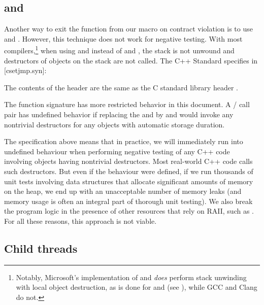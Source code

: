 \subsection{ and }

Another way to exit the function from our  macro on contract violation is to use  and . However, this technique does not work for negative testing. With most compilers,\footnote{Notably, Microsoft's implementation of  and  \emph{does} perform stack unwinding with local object destruction, as is done for  and  (see \cite{MSVCDocLongjmp}), while GCC and Clang do not.} when using  and  instead of  and , the stack is not unwound and destructors of objects on the stack are not called. The C++ Standard specifies in [csetjmp.syn]:

\begin{adjustwidth}{0.5cm}{0.5cm}
The contents of the header  are the same as the C standard library header .

The function signature  has more restricted behavior in this document. A / call pair has undefined behavior if replacing the  and  by  and  would invoke any nontrivial destructors for any objects with automatic storage duration.
\end{adjustwidth}

The specification above means that in practice, we will immediately run into undefined behaviour when performing negative testing of any C++ code involving objects having nontrivial destructors. Most real-world C++ code calls such destructors. But even if the behaviour were defined, if we run thousands of unit tests involving data structures that allocate significant amounts of memory on the heap, we end up with an unacceptable number of memory leaks (and memory usage is often an integral part of thorough unit testing). We also break the program logic in the presence of other resources that rely on RAII, such as . For all these reasons, this approach is not viable.

\subsection{Child threads}

